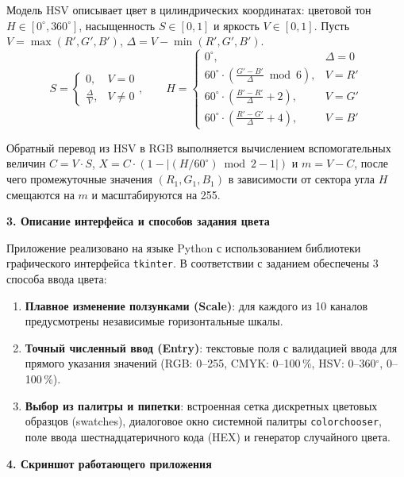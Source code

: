 \documentclass[14pt,a4paper]{extarticle}
\begin{document}
Модель HSV описывает цвет в цилиндрических координатах: цветовой тон $H \in [0^\circ, 360^\circ]$, насыщенность $S \in [0, 1]$ и яркость $V \in [0, 1]$.
Пусть $V = \max(R', G', B')$, $\Delta = V - \min(R', G', B')$.
\[
S = \begin{cases} 0, & V = 0 \\ \frac{\Delta}{V}, & V \neq 0 \end{cases}, \qquad
H = \begin{cases} 
0^\circ, & \Delta = 0 \\
60^\circ \cdot \left(\frac{G' - B'}{\Delta} \bmod 6\right), & V = R' \\
60^\circ \cdot \left(\frac{B' - R'}{\Delta} + 2\right), & V = G' \\
60^\circ \cdot \left(\frac{R' - G'}{\Delta} + 4\right), & V = B'
\end{cases}
\]

Обратный перевод из HSV в RGB выполняется вычислением вспомогательных величин $C = V \cdot S$, $X = C \cdot (1 - |(H / 60^\circ) \bmod 2 - 1|)$ и $m = V - C$, после чего промежуточные значения $(R_1, G_1, B_1)$ в зависимости от сектора угла $H$ смещаются на $m$ и масштабируются на 255.

\vspace{0.5cm}
\noindent\textbf{3. Описание интерфейса и способов задания цвета}

Приложение реализовано на языке Python с использованием библиотеки графического интерфейса \texttt{tkinter}. В соответствии с заданием обеспечены 3 способа ввода цвета:
\begin{enumerate}
    \item \textbf{Плавное изменение ползунками (Scale)}: для каждого из 10 каналов предусмотрены независимые горизонтальные шкалы.
    \item \textbf{Точный численный ввод (Entry)}: текстовые поля с валидацией ввода для прямого указания значений (RGB: 0--255, CMYK: 0--100\,\%, HSV: 0--360$^\circ$, 0--100\,\%).
    \item \textbf{Выбор из палитры и пипетки}: встроенная сетка дискретных цветовых образцов (swatches), диалоговое окно системной палитры \texttt{colorchooser}, поле ввода шестнадцатеричного кода (HEX) и генератор случайного цвета.
\end{enumerate}

\vspace{0.5cm}

\newpage
\noindent\textbf{4. Скриншот работающего приложения}
\end{document}
